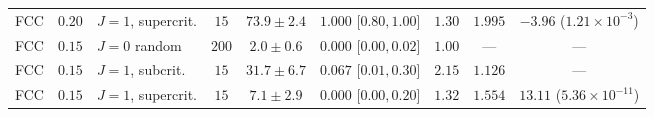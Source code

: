 \documentclass[aps,pre,reprint,superscriptaddress,amsmath,amssymb,floatfix]{revtex4-2}
\begin{document}
\begin{table}[t]
\begin{ruledtabular}
\begin{tabular}{lclcccccc}
FCC & $0.20$ & $J=1$, supercrit. & $15$  & $73.9 \pm 2.4$  & $1.000$ [$0.80,1.00$] & $1.30$ & $1.995$ & $-3.96$ ($1.21 \times 10^{-3}$) \\
\colrule
FCC & $0.15$ & $J=0$ random         & $200$ & $2.0 \pm 0.6$   & $0.000$ [$0.00,0.02$] & $1.00$ & ---     & --- \\
FCC & $0.15$ & $J=1$, subcrit. & $15$  & $31.7 \pm 6.7$  & $0.067$ [$0.01,0.30$] & $2.15$ & $1.126$ & --- \\
FCC & $0.15$ & $J=1$, supercrit. & $15$  & $7.1 \pm 2.9$   & $0.000$ [$0.00,0.20$] & $1.32$ & $1.554$ & $13.11$ ($5.36 \times 10^{-11}$) \\
\end{tabular}
\end{ruledtabular}
\endgroup
\end{table}
\end{document}
